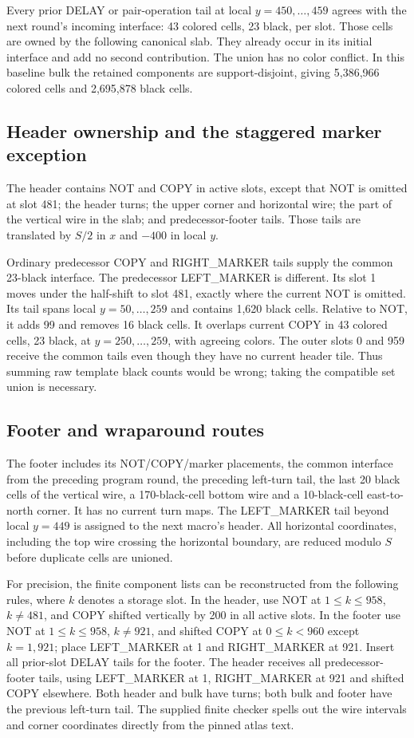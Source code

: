 \documentclass[11pt,letterpaper]{article}
\theoremstyle{definition}\newtheorem{definition}[theorem]{Definition}
\theoremstyle{remark}\newtheorem{remark}[theorem]{Remark}
\begin{document}
Every prior DELAY or pair-operation tail at local $y=450,\ldots,459$ agrees with the next round's incoming interface: 43 colored cells, 23 black, per slot. Those cells are owned by the following canonical slab. They already occur in its initial interface and add no second contribution. The union has no color conflict. In this baseline bulk the retained components are support-disjoint, giving 5,386,966 colored cells and 2,695,878 black cells.

\subsection{Header ownership and the staggered marker exception}
The header contains NOT and COPY in active slots, except that NOT is omitted at slot 481; the header turns; the upper corner and horizontal wire; the part of the vertical wire in the slab; and predecessor-footer tails. Those tails are translated by $S/2$ in $x$ and $-400$ in local $y$.

Ordinary predecessor COPY and RIGHT\_MARKER tails supply the common 23-black interface. The predecessor LEFT\_MARKER is different. Its slot 1 moves under the half-shift to slot 481, exactly where the current NOT is omitted. Its tail spans local $y=50,\ldots,259$ and contains 1,620 black cells. Relative to NOT, it adds 99 and removes 16 black cells. It overlaps current COPY in 43 colored cells, 23 black, at $y=250,\ldots,259$, with agreeing colors. The outer slots 0 and 959 receive the common tails even though they have no current header tile. Thus summing raw template black counts would be wrong; taking the compatible set union is necessary.

\subsection{Footer and wraparound routes}
The footer includes its NOT/COPY/marker placements, the common interface from the preceding program round, the preceding left-turn tail, the last 20 black cells of the vertical wire, a 170-black-cell bottom wire and a 10-black-cell east-to-north corner. It has no current turn maps. The LEFT\_MARKER tail beyond local $y=449$ is assigned to the next macro's header. All horizontal coordinates, including the top wire crossing the horizontal boundary, are reduced modulo $S$ before duplicate cells are unioned.

For precision, the finite component lists can be reconstructed from the following rules, where $k$ denotes a storage slot. In the header, use NOT at $1\le k\le958$, $k\ne481$, and COPY shifted vertically by 200 in all active slots. In the footer use NOT at $1\le k\le958$, $k\ne921$, and shifted COPY at $0\le k<960$ except $k=1,921$; place LEFT\_MARKER at 1 and RIGHT\_MARKER at 921. Insert all prior-slot DELAY tails for the footer. The header receives all predecessor-footer tails, using LEFT\_MARKER at 1, RIGHT\_MARKER at 921 and shifted COPY elsewhere. Both header and bulk have turns; both bulk and footer have the previous left-turn tail. The supplied finite checker spells out the wire intervals and corner coordinates directly from the pinned atlas text.
\end{document}
